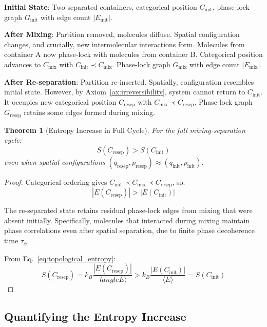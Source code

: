 \documentclass[superscriptaddress,prb,10pt]{revtex4-2}
\newtheorem{theorem}{Theorem}
\theoremstyle{definition}
\theoremstyle{remark}
\begin{document}
\textbf{Initial State}: Two separated containers, categorical position $C_{\text{init}}$, phase-lock graph $G_{\text{init}}$ with edge count $|E_{\text{init}}|$.

\textbf{After Mixing}: Partition removed, molecules diffuse. Spatial configuration changes, and crucially, new intermolecular interactions form. Molecules from container A now phase-lock with molecules from container B. Categorical position advances to $C_{\text{mix}}$ with $C_{\text{init}} \prec C_{\text{mix}}$. Phase-lock graph $G_{\text{mix}}$ with edge count $|E_{\text{mix}}|$.

\textbf{After Re-separation}: Partition re-inserted. Spatially, configuration resembles initial state. However, by Axiom~\ref{ax:irreversibility}, system cannot return to $C_{\text{init}}$. It occupies new categorical position $C_{\text{resep}}$ with $C_{\text{mix}} \prec C_{\text{resep}}$. Phase-lock graph $G_{\text{resep}}$ retains some edges formed during mixing.

\begin{theorem}[Entropy Increase in Full Cycle]
\label{thm:entropy_cycle}
For the full mixing-separation cycle:
\begin{equation}
S(C_{\text{resep}}) > S(C_{\text{init}})
\end{equation}
even when spatial configurations $(q_{\text{resep}}, p_{\text{resep}}) \approx (q_{\text{init}}, p_{\text{init}})$.
\end{theorem}

\begin{proof}
Categorical ordering gives $C_{\text{init}} \prec C_{\text{mix}} \prec C_{\text{resep}}$, so:
\begin{equation}
|E(C_{\text{resep}})| > |E(C_{\text{init}})|
\end{equation}

The re-separated state retains residual phase-lock edges from mixing that were absent initially. Specifically, molecules that interacted during mixing maintain phase correlations even after spatial separation, due to finite phase decoherence time $\tau_{\phi}$.

From Eq.~\eqref{eq:topological_entropy}:
\begin{equation}
S(C_{\text{resep}}) = k_B \frac{|E(C_{\text{resep}})|}{\ langle E \rangle} > k_B \frac{|E(C_{\text{init}})|}{\langle E \rangle} = S(C_{\text{init}})
\end{equation}
\end{proof}

\subsection{Quantifying the Entropy Increase}
\end{document}
